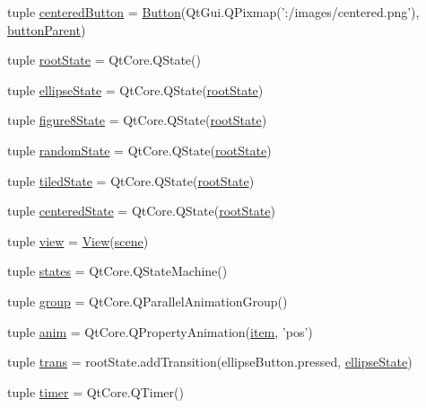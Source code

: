 \begin{DoxyCompactItemize}
\item 
tuple \hyperlink{namespaceanimatedtiles_ad5df798c7a5a8010105ea14f490b0ecb}{centered\+Button} = \hyperlink{classanimatedtiles_1_1Button}{Button}(Qt\+Gui.\+Q\+Pixmap('\+:/images/centered.\+png'), \hyperlink{namespaceanimatedtiles_aa63235906027ecca5b15b81876f430a5}{button\+Parent})
\item 
tuple \hyperlink{namespaceanimatedtiles_a873376be67b1d220a932641f09deeef0}{root\+State} = Qt\+Core.\+Q\+State()
\item 
tuple \hyperlink{namespaceanimatedtiles_a813aeb66dcd12d899ba169f96a288f6f}{ellipse\+State} = Qt\+Core.\+Q\+State(\hyperlink{namespaceanimatedtiles_a873376be67b1d220a932641f09deeef0}{root\+State})
\item 
tuple \hyperlink{namespaceanimatedtiles_a9b166216b863ae0be32c5d7da097fa14}{figure8\+State} = Qt\+Core.\+Q\+State(\hyperlink{namespaceanimatedtiles_a873376be67b1d220a932641f09deeef0}{root\+State})
\item 
tuple \hyperlink{namespaceanimatedtiles_a729bc78eefb36301d6c31cfd7f792c4d}{random\+State} = Qt\+Core.\+Q\+State(\hyperlink{namespaceanimatedtiles_a873376be67b1d220a932641f09deeef0}{root\+State})
\item 
tuple \hyperlink{namespaceanimatedtiles_a869dd15a1efe39587739506e4cbdf7b9}{tiled\+State} = Qt\+Core.\+Q\+State(\hyperlink{namespaceanimatedtiles_a873376be67b1d220a932641f09deeef0}{root\+State})
\item 
tuple \hyperlink{namespaceanimatedtiles_ad21e801dab06e28392c0875afd93ef03}{centered\+State} = Qt\+Core.\+Q\+State(\hyperlink{namespaceanimatedtiles_a873376be67b1d220a932641f09deeef0}{root\+State})
\item 
tuple \hyperlink{namespaceanimatedtiles_a1a76cb9d1e9dc29d1ce717674c9242b2}{view} = \hyperlink{classanimatedtiles_1_1View}{View}(\hyperlink{namespaceanimatedtiles_aeca35dab2ca795f6e6dabf76a4797ef0}{scene})
\item 
tuple \hyperlink{namespaceanimatedtiles_a205ec3f5950b4102e125480af62e56e2}{states} = Qt\+Core.\+Q\+State\+Machine()
\item 
tuple \hyperlink{namespaceanimatedtiles_ac070b7f01ffa35fb7e31e66969a7b187}{group} = Qt\+Core.\+Q\+Parallel\+Animation\+Group()
\item 
tuple \hyperlink{namespaceanimatedtiles_aa99b96cc33dd4ed567e82da6967255c8}{anim} = Qt\+Core.\+Q\+Property\+Animation(\hyperlink{namespaceanimatedtiles_ac9261de1a75e3315cb038f63544756d0}{item}, 'pos')
\item 
tuple \hyperlink{namespaceanimatedtiles_af1bb7d953d2aca57c73a99e7968a4851}{trans} = root\+State.\+add\+Transition(ellipse\+Button.\+pressed, \hyperlink{namespaceanimatedtiles_a813aeb66dcd12d899ba169f96a288f6f}{ellipse\+State})
\item 
tuple \hyperlink{namespaceanimatedtiles_a0c37e47c05cd863ff80fa18ff881e92d}{timer} = Qt\+Core.\+Q\+Timer()
\end{DoxyCompactItemize}


